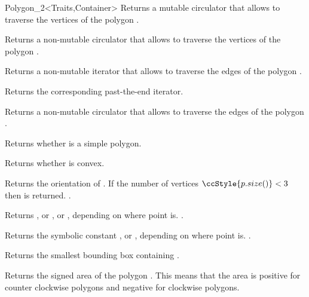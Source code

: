\begin{ccClassTemplate}{Polygon_2<Traits,Container>}
    { Returns a mutable circulator that allows to traverse the vertices of
      the polygon .}

    { Returns a non-mutable circulator that allows to traverse the vertices of
      the polygon .}

    { Returns a non-mutable iterator that allows to traverse the edges of
      the polygon .}

    { Returns the corresponding past-the-end iterator. }

    { Returns a non-mutable circulator that allows to traverse the edges of
      the polygon .}


    { Returns whether  is a simple polygon.}

    { Returns whether  is convex. }

    { Returns the orientation of \ccVar. If the number of vertices 
      $\ccStyle{p.size()} < 3$ then  is returned.
      \ccPrecond {}.
    }

    { Returns , or ,
       or , 
       depending on where point  is.
      \ccPrecond {}.
    }

    { Returns the symbolic constant , 
      or , depending on where point
       is.
      \ccPrecond {}.
    }

    { Returns the smallest bounding box containing \ccVar.}
    
    { Returns the signed area of the polygon \ccVar. This means that the area is
      positive for counter clockwise polygons and negative for clockwise polygons.
    }
      

\end{ccClassTemplate}
